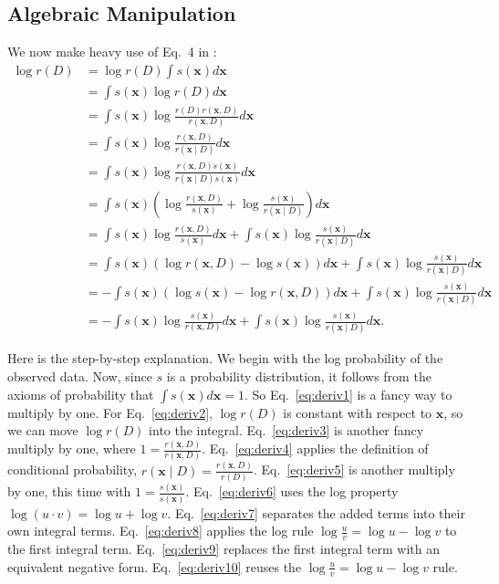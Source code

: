 \documentclass[12pt]{article}
\begin{document}
\subsection{Algebraic Manipulation}

We now make heavy use of Eq.~4 in \autocite{kb}:
\begin{align}
    \log{r(D)} &= \log{r(D)} \int s(\bm{x}) d\bm{x}\label{eq:deriv1} \\
               &= \int s(\bm{x}) \log{r(D)} d\bm{x}\label{eq:deriv2} \\
               &= \int s(\bm{x}) \log{\frac{r(D)r(\bm{x}, D)}{r(\bm{x}, D)}}
    d\bm{x}\label{eq:deriv3} \\
            &= \int s(\bm{x}) \log{\frac{r(\bm{x}, D)}{r(\bm{x} \mid D)}}
    d\bm{x}\label{eq:deriv4} \\
            &= \int s(\bm{x}) \log{\frac{r(\bm{x}, D)s(\bm{x})}{r(\bm{x} \mid D)
    s(\bm{x})}}d\bm{x}\label{eq:deriv5} \\
            &= \int s(\bm{x})\left( \log{\frac{r(\bm{x}, D)}{s(\bm{x})}} +
    \log{\frac{s(\bm{x})}{r(\bm{x} \mid D)}}\right) d\bm{x}\label{eq:deriv6} \\
            &= \int s(\bm{x})\log{\frac{r(\bm{x}, D)}{s(\bm{x})}} d\bm{x} +
    \int s(\bm{x})\log{\frac{s(\bm{x})}{r(\bm{x} \mid D)}}
    d\bm{x}\label{eq:deriv7} \\
            &= \int s(\bm{x})\left(\log{r(\bm{x}, D)} - \log{s(\bm{x})}\right)
    d\bm{x} + \int s(\bm{x})\log{\frac{s(\bm{x})}{r(\bm{x} \mid D)}}
    d\bm{x}\label{eq:deriv8} \\
            &= -\int s(\bm{x})\left(\log{s(\bm{x})} - \log{r(\bm{x}, D)}\right)
    d\bm{x} + \int s(\bm{x})\log{\frac{s(\bm{x})}{r(\bm{x} \mid D)}}
    d\bm{x}\label{eq:deriv9} \\
            &= -\int s(\bm{x})\log{\frac{s(\bm{x})}{r(\bm{x}, D)}} d\bm{x} +
    \int s(\bm{x})\log{\frac{s(\bm{x})}{r(\bm{x} \mid D)}}
    d\bm{x}.\label{eq:deriv10}
\end{align}

Here is the step-by-step explanation.  We begin with the log probability of the
observed data.  Now, since $s$ is a probability distribution, it follows from
the axioms of probability that $\int s(\bm{x}) d\bm{x} = 1$.  So
Eq.~\ref{eq:deriv1} is a fancy way to multiply by one.  For Eq.~\ref{eq:deriv2},
$\log{r(D)}$ is constant with respect to $\bm{x}$, so we can move $\log{r(D)}$
into the integral.  Eq.~\ref{eq:deriv3} is another fancy multiply by one, where
$1 = \frac{r(\bm{x}, D)}{r(\bm{x}, D)}$.  Eq.~\ref{eq:deriv4} applies the
definition of conditional probability,  $r(\bm{x} \mid D) = \frac{r(\bm{x},
D)}{r(D)}$.  Eq.~\ref{eq:deriv5} is another multiply by one, this time with $1 =
\frac{s(\bm{x})}{s(\bm{x})}$.  Eq.~\ref{eq:deriv6} uses the log property
$\log{(u \cdot v)} = \log{u} + \log{v}$.  Eq.~\ref{eq:deriv7} separates the
added terms into their own integral terms.  Eq.~\ref{eq:deriv8} applies the log
rule $\log{\frac{u}{v}} = \log{u} - \log{v}$ to the first integral term.
Eq.~\ref{eq:deriv9} replaces the first integral term with an equivalent
negative form.  Eq.~\ref{eq:deriv10} reuses the $\log{\frac{u}{v}} = \log{u} -
\log{v}$ rule.
\end{document}
